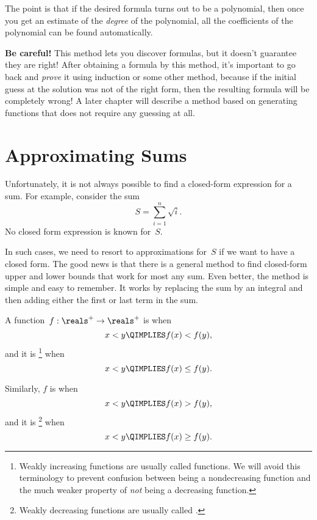 The point is that if the desired formula turns out to be a polynomial,
then once you get an estimate of the \emph{degree} of the polynomial,
all the coefficients of the polynomial can be found automatically.

\textbf{Be careful!}  This method lets you discover formulas, but it
doesn't guarantee they are right!  After obtaining a formula by this
method, it's important to go back and \emph{prove} it using induction
or some other method, because if the initial guess at the solution was
not of the right form, then the resulting formula will be completely
wrong!  A later chapter will describe
a method based on generating functions that does not require any
guessing at all.


\section{Approximating Sums}

Unfortunately, it is not always possible to find a closed-form
expression for a sum.  For example, consider the sum
\[
    S = \sum_{i = 1}^n \sqrt{i}.
\]
No closed form expression is known for~$S$.

In such cases, we need to resort to approximations for~$S$ if we want
to have a closed form.  The good news is that there is a general
method to find closed-form upper and lower bounds that work for most
any sum.  Even better, the method is simple and easy to remember.  It
works by replacing the sum by an integral and then adding either the
first or last term in the sum.

\begin{definition}\label{weakly_increasing_function_def}
A function~$f: \reals^+ \to \reals^+$
is  when
\[
x < y \QIMPLIES f(x) < f(y),
\]
and it is \footnote{Weakly increasing
  functions are usually called  functions.  We
  will avoid this terminology to prevent confusion between being a
  nondecreasing function and the much weaker property
  of \emph{not} being a decreasing function.} when
\[
x < y \QIMPLIES f(x) \le f(y).
\]

Similarly, $f$ is  when
\[
x < y \QIMPLIES f(x) > f(y),
\]
and it is \footnote{Weakly decreasing
  functions are usually called .}  when
\[
x < y \QIMPLIES f(x) \ge f(y).
\]
\end{definition}

